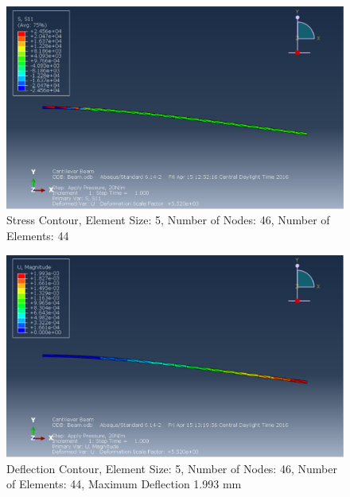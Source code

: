 \documentclass[a4paper]{article}
\begin{document}
\begin{figure}[ht]
\centering
\includegraphics[scale=.50]{3Nsize5Stress.PNG}
\caption{Stress Contour, Element Size: 5, Number of Nodes: 46, Number of Elements: 44}
\end{figure}
\begin{figure}[ht]
\centering
\includegraphics[scale=.50]{3Nsize5MDisplacement.PNG}
\caption{Deflection Contour, Element Size: 5, Number of Nodes: 46, Number of Elements: 44, Maximum Deflection 1.993 mm}
\end{figure}
\end{document}
